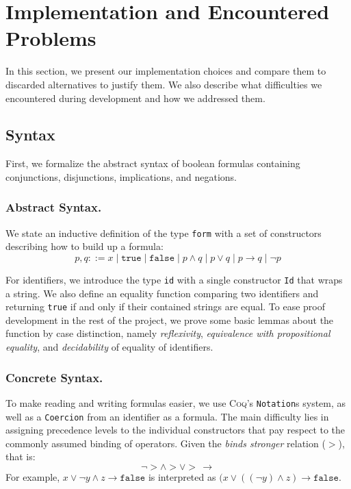 \section{Implementation and Encountered Problems}\label{sec:impl}

In this section, we present our implementation choices and compare them to discarded alternatives to justify them. 
We also describe what difficulties we encountered during development and how we addressed them.

\subsection{Syntax}

First, we formalize the abstract syntax of boolean formulas containing conjunctions, disjunctions, implications, and negations. 

\subsubsection{Abstract Syntax.}

We state an inductive definition of the type \texttt{form} with a set of constructors describing how to build up a formula:
\begin{equation}
    p, q ::= x\;|\;\texttt{true}\;|\;\texttt{false}\;|\;p \land q\;|\;p \lor q\;|\;p \rightarrow q\;|\;\neg p
\end{equation}

For identifiers, we introduce the type \texttt{id} with a single constructor \texttt{Id} that wraps a string. We also define an equality function comparing two identifiers and returning \texttt{true} if and only if their contained strings are equal. To ease proof development in the rest of the project, we prove some basic lemmas about the function by case distinction, namely \emph{reflexivity}, \emph{equivalence with propositional equality}, and \emph{decidability} of equality of identifiers.

\subsubsection{Concrete Syntax.}

To make reading and writing formulas easier, we use \textsc{Coq}'s \texttt{Notation}s system, as well as a \texttt{Coercion} from an identifier as a formula. 
The main difficulty lies in assigning precedence levels to the individual constructors that pay respect to the commonly assumed binding of operators. 
Given the \emph{binds stronger} relation ($>$), that is:
\begin{equation}
    \neg > \land > \lor >\,\rightarrow
\end{equation}
For example, $x \lor \neg y \land z \rightarrow \texttt{false}$ is interpreted as $(x \lor ((\neg y) \land z) \rightarrow \texttt{false}$. 

